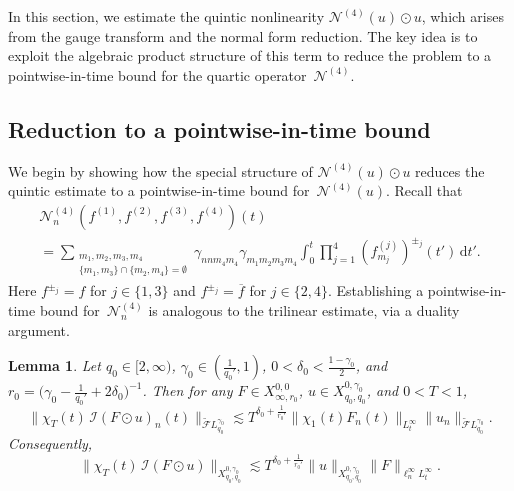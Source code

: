 \documentclass[11pt,reqno,english]{amsart}
\numberwithin{equation}{section}
\theoremstyle{plain}
\newtheorem{lemma}[theorem]{Lemma}
\theoremstyle{definition}
\theoremstyle{remark}
\newcommand{\ov}{\overline}
\newcommand{\dotcirc}{\mathbin{\odot}}
\newcommand{\dd}{\mathrm{d}}
\begin{document}
In this section, we estimate the quintic nonlinearity $\mathcal{N}^{(4)}(u)\dotcirc u$, which arises from the gauge transform and the normal form reduction. The key idea is to exploit the algebraic product structure of this term to reduce the problem to a pointwise-in-time bound for the quartic operator~$\mathcal{N}^{(4)}$.

\subsection{Reduction to a pointwise-in-time bound}

We begin by showing how the special structure of $\mathcal{N}^{(4)}(u)\dotcirc u$ reduces the quintic estimate to a pointwise-in-time bound for~$\mathcal{N}^{(4)}(u)$.
Recall that
\begin{multline*}
	\mathcal{N}_n^{(4)}(f^{(1)},f^{(2)},f^{(3)},f^{(4)})(t)
	\\
	=\sum_{\substack{m_1,m_2,m_3,m_4\\
			\{m_1,m_3\}\cap\{m_2,m_4\}=\emptyset}}
	\gamma_{nnm_4m_4}\gamma_{m_1m_2m_3m_4}
	\int_0^t \prod_{j=1}^4 (f_{m_j}^{(j)})^{\pm_j}(t')\, \dd t'.
\end{multline*}
Here $f^{\pm_j}=f$ for $j\in\{1,3\}$ and $f^{\pm_j}=\ov{f}$ for $j\in\{2,4\}$.
Establishing a pointwise-in-time bound for~$\mathcal{N}_n^{(4)}$ is analogous to the trilinear estimate, via a duality argument.

\begin{lemma}\label{lem:N4mapping}
	Let $q_0\in[2,\infty)$, $\gamma_0\in(\frac{1}{q_0'},1)$, $0<\delta_0<\frac{1-\gamma_0}{2}$, and $r_0=\big(\gamma_0-\frac{1}{q_0'}+2\delta_0\big)^{-1}$. Then for any $F\in X_{\infty,r_0}^{0,0}$, $u\in X_{q_0,q_0}^{0,\gamma_0}$, and $0<T<1$,
	\[
	\|\chi_T(t)\,\mathcal{I}(F\dotcirc u)_n(t)\|_{\widetilde{\mathcal{F}}L_{q_0}^{\gamma_0}}
	\lesssim
	T^{\delta_0+\frac{1}{r_0'}}\|\chi_1(t)F_n(t)\|_{L_t^{\infty}}\|u_n\|_{\widetilde{\mathcal{F}}L_{q_0}^{\gamma_0}}.
	\]
	Consequently,
	\[
	\|\chi_T(t)\,\mathcal{I}(F\dotcirc u)\|_{X_{q_0,q_0}^{0,\gamma_0}}
	\lesssim
	T^{\delta_0+\frac{1}{r_0'}} \|u\|_{X_{q_0,q_0}^{0,\gamma_0}}\|F\|_{\ell_n^{\infty}L_t^{\infty}}.
	\]
\end{lemma}
\end{document}
